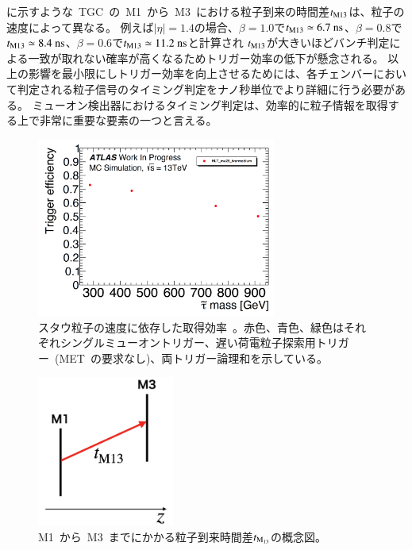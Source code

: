 に示すような~TGC~の~M1~から~M3~における粒子到来の時間差$t_{\rm{M13}}$は、粒子の速度によって異なる。
例えば$|\eta|=1.4$の場合、$\beta=1.0$で$t_{\rm M13}\simeq6.7~\rm ns$、$\beta=0.8$で$t_{\rm M13}\simeq8.4~\rm ns$、$\beta=0.6$で$t_{\rm M13}\simeq11.2~\rm ns$と計算され
$t_{\rm{M13}}$が大きいほどバンチ判定による一致が取れない確率が高くなるためトリガー効率の低下が懸念される。
以上の影響を最小限にしトリガー効率を向上させるためには、各チェンバーにおいて判定される粒子信号のタイミング判定をナノ秒単位でより詳細に行う必要がある。
ミューオン検出器におけるタイミング判定は、効率的に粒子情報を取得する上で非常に重要な要素の一つと言える。
\begin{figure}[tbp]
        \centering   
        \includegraphics[width=0.7\textwidth,page=4]{img/pdf3/sumi.pdf}
        \caption[スタウ粒子の速度に依存した取得効率]{スタウ粒子の速度に依存した取得効率~\cite{MT:01}。赤色、青色、緑色はそれぞれシングルミューオントリガー、遅い荷電粒子探索用トリガー~(MET~の要求なし)、両トリガー論理和を示している。}
        \label{fig:sumi4}
\end{figure}
\begin{figure}[tbp]
        \centering   
        \includegraphics[width=0.4\textwidth,page=4]{img/pdf3/time.png}
        \caption[M1~から~M3~までにかかる粒子到来時間差$t_{\rm M_{13}}$の概念図]
        {M1~から~M3~までにかかる粒子到来時間差$t_{\rm M_{13}}$の概念図。}
        \label{fig:time}
\end{figure}

